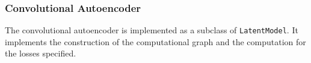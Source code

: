 
\subsubsection{Convolutional Autoencoder}\label{sec:convae_implement}

The convolutional autoencoder is implemented as a subclass of \lstinline{LatentModel}. It implements the construction of the computational graph and the computation for the losses specified. 